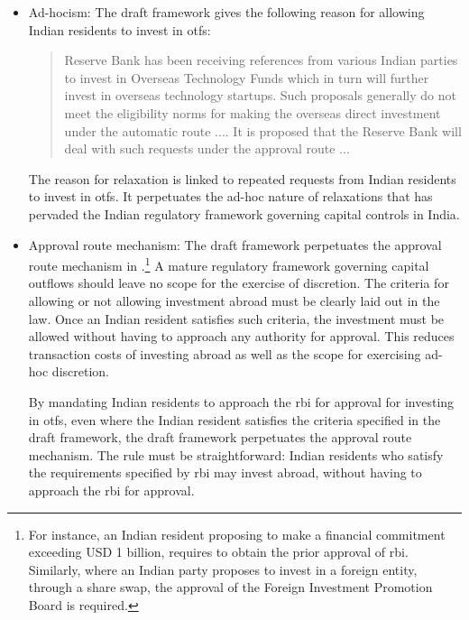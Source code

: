 \documentclass[11pt,a4paper]{article} \usepackage[parfill]{parskip}
\begin{document}
\begin{description}
\begin{itemize}
  \item Ad-hocism: The draft framework gives the following reason for
    allowing Indian residents to invest in \glspl{otf}:

  \begin{quote}
    Reserve Bank has been receiving references from various Indian
    parties to invest in Overseas Technology Funds which in turn will
    further invest in overseas technology startups. Such proposals
    generally do not meet the eligibility norms for making the
    overseas direct investment under the automatic route .... It is
    proposed that the Reserve Bank will deal with such requests under
    the approval route ...
  \end{quote}

  The reason for relaxation is linked to repeated requests from Indian
  residents to invest in \glspl{otf}. It perpetuates the ad-hoc nature
  of relaxations that has pervaded the Indian regulatory framework
  governing capital controls in India.

\item Approval route mechanism: The draft framework perpetuates the
  approval route mechanism in .\footnote{For
    instance, an Indian resident proposing to make a financial
    commitment exceeding USD 1 billion, requires to obtain the prior
    approval of \gls{rbi}. Similarly, where an Indian party proposes
    to invest in a foreign entity, through a share swap, the approval
    of the Foreign Investment Promotion Board is required.}  A mature
  regulatory framework governing capital outflows should leave no
  scope for the exercise of discretion. The criteria for allowing or
  not allowing investment abroad must be clearly laid out in the
  law. Once an Indian resident satisfies such criteria, the investment
  must be allowed without having to approach any authority for
  approval. This reduces transaction costs of investing abroad as well
  as the scope for exercising ad-hoc discretion.

  By mandating Indian residents to approach the \gls{rbi} for approval
  for investing in \glspl{otf}, even where the Indian resident
  satisfies the criteria specified in the draft framework, the draft
  framework perpetuates the approval route mechanism. The rule must be
  straightforward: Indian residents who satisfy the requirements
  specified by \gls{rbi} may invest abroad, without having to approach
  the \gls{rbi} for approval.
\end{itemize}


\end{description}
\end{document}
